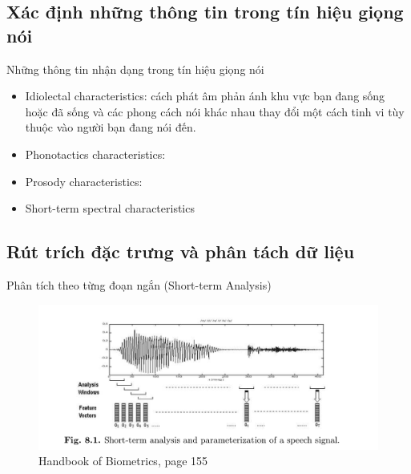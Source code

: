 \documentclass[notheorems, aspectratio=54]{beamer}
\begin{document}
\subsection{Xác định những thông tin trong tín hiệu giọng nói}
\begin{frame}
	Những thông tin nhận dạng trong tín hiệu giọng nói
	\begin{itemize}
		\item Idiolectal characteristics: cách phát âm phản ánh khu vực bạn đang sống hoặc đã sống và các phong cách nói khác nhau thay đổi một cách tinh vi tùy thuộc vào người bạn đang nói đến.
		\item Phonotactics characteristics: 
		\item Prosody characteristics:
		\item Short-term spectral characteristics
	\end{itemize}
\end{frame}

\subsection{Rút trích đặc trưng và phân tách dữ liệu}
\begin{frame}{Phân tích theo từng đoạn ngắn (Short-term Analysis)}
	\begin{figure}[h!]
		\includegraphics[width=0.9\linewidth]{images/figure_8_1.png}
		\caption{Handbook of Biometrics, page 155}
		\label{fig:writing-thesis}
	\end{figure}
\end{frame}
\end{document}
